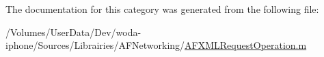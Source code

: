 The documentation for this category was generated from the following file\-:\begin{DoxyCompactItemize}
\item 
/\-Volumes/\-User\-Data/\-Dev/woda-\/iphone/\-Sources/\-Librairies/\-A\-F\-Networking/\hyperlink{_a_f_x_m_l_request_operation_8m}{A\-F\-X\-M\-L\-Request\-Operation.\-m}\end{DoxyCompactItemize}

